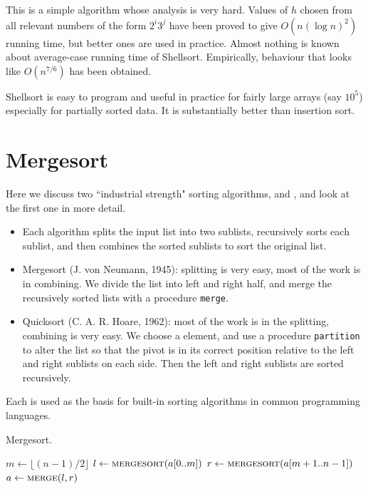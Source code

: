 This is a simple algorithm whose analysis is very hard. 
Values of $h$ chosen from all relevant numbers of the form $2^i 3^j$ have been proved to give 
$O(n (\log n)^2)$ running time, but better ones are used in practice. 
Almost nothing is known about average-case running time of Shellsort. 
Empirically, behaviour that looks like $O(n^{7/6})$ has been obtained. 

Shellsort is easy to program and useful in practice for fairly large arrays (say $10^5$) especially for partially sorted data. 
It is substantially  better than insertion sort.


\chapter{Mergesort}  %
\label{sec:mergesort}
Here we discuss two ``industrial strength" sorting algorithms,
 and , and look at the first one
in more detail. 
\begin{itemize}
\item Each algorithm splits the input list into two sublists, 
recursively sorts each sublist, and then combines the sorted sublists to sort 
the original list.
\item Mergesort (J. von Neumann, 1945): splitting is very easy, most 
of the work is in combining. 
We divide the list into left and right half, and merge the recursively sorted 
lists with a procedure \texttt{merge}. 
\item Quicksort (C. A. R. Hoare, 1962): most of the work is in the 
splitting, combining is very easy. We choose a  element, and use a 
procedure \texttt{partition} to alter the list so that the pivot is in its 
correct position relative to the left and right sublists on each side.
Then the left and right sublists are sorted recursively.
\end{itemize}
Each is used as the basis for 
built-in sorting algorithms in common programming languages.

\begin{algorithm}[H]
  \caption{Mergesort.}
    \label{alg:mergesort}
\begin{algorithmic}[0]
\State $m \gets \lfloor (n-1)/2 \rfloor$ 
\State $l \gets \Call{mergesort}{a[0..m]}$ 
\State $r \gets  \Call{mergesort}{a[m+1..n-1]}$ 
\State $a \gets  \Call{merge}{l, r}$ 
\EndIf
\State {}
\EndFunction  
\end{algorithmic}
\end{algorithm}

